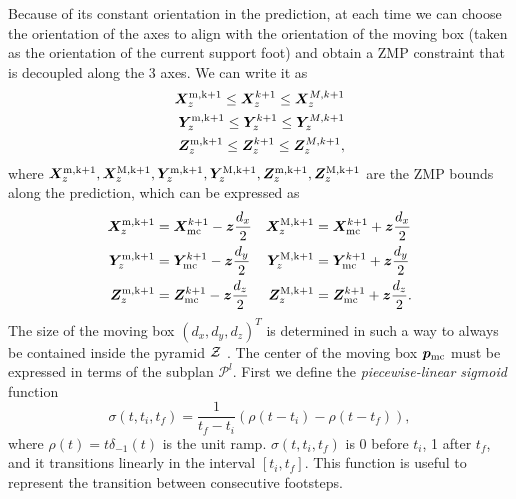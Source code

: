 Because of its constant orientation in the prediction, at each time we can
choose the orientation of the axes to align with the orientation of the moving
box (taken as the orientation of the current support foot) and obtain a ZMP
constraint that is decoupled along the 3 axes. We can write it as
\begin{align}
    \label{eq:ZMP-constraints}
    \begin{split}
        \bm{X}_z^{\rm m,k+1} \le \bm{X}_z^{k+1} \le \bm{X}_z^{M,k+1} \\
        \bm{Y}_z^{\rm m,k+1} \le \bm{Y}_z^{k+1} \le \bm{Y}_z^{M,k+1} \\
        \bm{Z}_z^{\rm m,k+1} \le \bm{Z}_z^{k+1} \le \bm{Z}_z^{M,k+1},
    \end{split}
\end{align}
where $\bm{X}_z^{\rm m,k+1}, \bm{X}_z^{\rm M,k+1}, \bm{Y}_z^{\rm m,k+1},
\bm{Y}_z^{\rm M,k+1}, \bm{Z}_z^{\rm m,k+1}, \bm{Z}_z^{\rm M,k+1}$
are the ZMP bounds along the prediction, which can be expressed as
\begin{equation}
    \begin{aligned}
        \bm{X}_z^{\rm m,k+1} &= \bm{X}_{\rm mc}^{k+1} - {\bm{z}} \frac{d_x}{2} &
        \bm{X}_z^{\rm M,k+1} &= \bm{X}_{\rm mc}^{k+1} + {\bm{z}} \frac{d_x}{2} \\
        \bm{Y}_z^{\rm m,k+1} &= \bm{Y}_{\rm mc}^{k+1} - {\bm{z}} \frac{d_y}{2} &
        \bm{Y}_z^{\rm M,k+1} &= \bm{Y}_{\rm mc}^{k+1} + {\bm{z}} \frac{d_y}{2} \\
        \bm{Z}_z^{\rm m,k+1} &= \bm{Z}_{\rm mc}^{k+1} - {\bm{z}} \frac{d_z}{2} &
        \bm{Z}_z^{\rm M,k+1} &= \bm{Z}_{\rm mc}^{k+1} + {\bm{z}} \frac{d_z}{2}.
    \end{aligned}
\label{eq:FAPA:zmp_constraint_displacement}
\end{equation}
The size of the moving box $(d_x, d_y, d_z)^T$ is
determined in such a way to always be contained inside the pyramid $\cal Z$
\cite{Zamparelli2018SYROCO, Cipriano2023RAS}.
The center of the moving box ${\bm{p}}_{\rm mc}$ must be expressed in terms of
the subplan $\mathcal{P}^l$. First we define the {\em piecewise-linear sigmoid}
function 
\begin{equation*}
\sigma (t,t_i,t_f)=\frac{1}{t_f-t_i} \left(\rho(t-t_i)-\rho(t-t_f)\right),
\end{equation*}
where $\rho(t)=t\delta_{-1}(t)$ is the unit ramp.
$\sigma (t,t_i,t_f)$ is 0 before $t_i$,  1 after $t_f$, and it transitions
linearly in the interval $[t_i,t_f]$. This function is useful to represent
the transition between consecutive footsteps.

